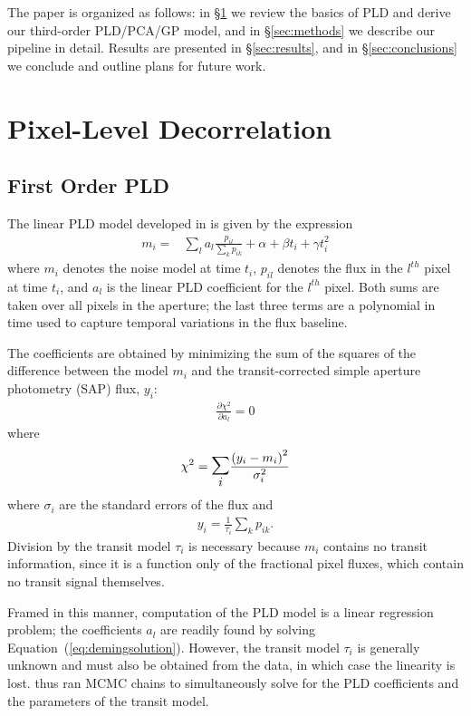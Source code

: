 \documentclass[]{emulateapj}
\begin{document}
The paper is organized as follows: in \S\ref{sec:pld} we review the basics of PLD and
derive our third-order PLD/PCA/GP model, and in \S\ref{sec:methods} we describe our pipeline
in detail. Results are presented in \S\ref{sec:results}, and in \S\ref{sec:conclusions}
we conclude and outline plans for future work.

\section{Pixel-Level Decorrelation}
\label{sec:pld}
\subsection{First Order PLD}
\label{sec:firstorder}
The linear PLD model developed in \cite{DEM15} is given by the expression
\begin{align}
\label{eq:demingmodel}
m_i = &\sum\limits_{l}a_l\frac{p_{il}}{\sum\limits_{k}p_{ik}} + \alpha + \beta t_i + \gamma t_i^2
\end{align}
where $m_i$ denotes the noise model at time $t_i$,
$p_{il}$ denotes the flux in the $l^{th}$ pixel at time $t_i$, and $a_l$ is
the linear PLD coefficient for the $l^{th}$ pixel. Both sums are taken over
all pixels in the aperture; the last three terms are a polynomial in time used
to capture temporal variations in the flux baseline.

The coefficients are obtained by minimizing the sum of the squares of the difference
between the model $m_i$ and the transit-corrected simple aperture photometry (SAP) flux, $y_i$:
\begin{align}
\label{eq:demingsolution}
\frac{\partial \chi^2}{\partial a_l} = 0
\end{align}
where
\begin{align}
\label{eq:demingchisq}
\chi^2 = \mathlarger{\mathlarger{\sum\limits_{i}}}\frac{\left(y_i - m_i\right)^2}{\sigma_i^2}
\end{align}
where $\sigma_i$ are the standard errors of the flux and
\begin{align}
\label{eq:demingcorrsap}
y_i = \frac{1}{\tau_i}\sum\limits_{k}p_{ik}.
\end{align}
Division by the transit model $\tau_i$ is necessary because $m_i$ contains no transit
information, since it is a function only of the fractional pixel fluxes, which
contain no transit signal themselves.

Framed in this manner, computation of the PLD model is a linear regression problem; the
coefficients $a_l$ are readily found by solving Equation~(\ref{eq:demingsolution}).
However, the transit model $\tau_i$ is generally unknown and must also be obtained from
the data, in which case the linearity is lost. \cite{DEM15} thus ran MCMC chains to
simultaneously solve for the PLD coefficients and the parameters of the transit model.
\end{document}
